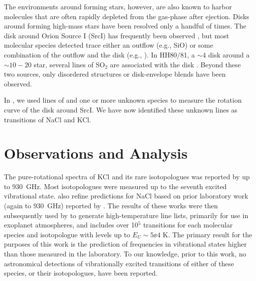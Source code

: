 \documentclass[twocolumn]{aastex62}
\newcommand{\sourcei}{SrcI\xspace}
\newcommand{\bam}[1]{\textcolor{green!65!black}{\textbf{[BAM: #1]}}}
\newcommand{\ag}[1]{\textcolor{red!65!black}{\textbf{[AG: #1]}}}
\begin{document}


The environments around forming stars, however, are also known to harbor
molecules that are often rapidly depleted from the gas-phase after ejection.
Disks around forming high-mass stars have been resolved only a handful of
times.  The disk around Orion Source I (\sourcei) has frequently been observed
\citep{Hirota2014a,Plambeck2016a,Ginsburg2018b}, but most molecular species
detected trace either an outflow (e.g., SiO) or some combination of the outflow
and the disk (e.g., \water).  In HH80/81, a $\sim4$ \msun disk around a
$\sim10-20$ \msun star, several lines of SO$_2$ are associated with the disk
\citep{Girart2017a}.  Beyond these two sources, only disordered structures or
disk-envelope blends have been observed.

In \citet{Ginsburg2018b}, we used lines of \water and one or
more unknown species to measure the rotation curve of the disk around \sourcei.
We have now identified these unknown lines as transitions of NaCl and KCl.

\section{Observations and Analysis}

The pure-rotational spectra of KCl and its rare isotopologues was reported by \citet{Caris2004a} up to 930~GHz.  Most isotopologues were measured up to the seventh excited vibrational state.  \citet{Caris2004a} also refine predictions for NaCl based on prior laboratory work (again to 930~GHz) reported by \citet{Caris2002a}.  The results of these works were then subsequently used by \citet{Barton2014a} to generate high-temperature line lists, primarily for use in exoplanet atmospheres, and includes over 10$^5$ transitions for each molecular species and isotopologue with levels up to $E_U\sim5\ee{4}$ K. The primary result for the purposes of this work is the prediction of frequencies in vibrational states higher than those measured in the laboratory. To our knowledge, prior to this work, no astronomical detections of vibrationally excited transitions of either of these species, or their isotopologues, have been reported.
\end{document}
